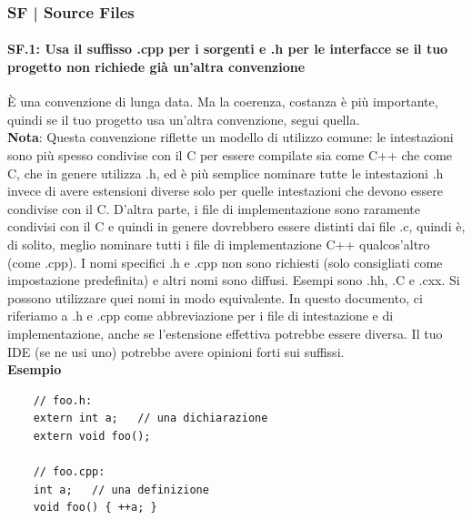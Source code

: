 

\newpage

\subsubsection{SF | Source Files}

\paragraph{SF.1: Usa il suffisso .cpp per i sorgenti e .h per le interfacce se il tuo progetto non richiede già un'altra convenzione}

\textsf{\small È una convenzione di lunga data. Ma la coerenza, costanza è più importante, quindi se il tuo progetto usa un'altra convenzione, segui quella. } \\

\textsf{\small \textbf{Nota}: Questa convenzione riflette un modello di utilizzo comune: le intestazioni sono più spesso condivise con il C per essere compilate sia come C++ che come C, che in genere utilizza .h, ed è più semplice nominare tutte le intestazioni .h invece di avere estensioni diverse solo per quelle intestazioni che devono essere condivise con il C. D'altra parte, i file di implementazione sono raramente condivisi con il C e quindi in genere dovrebbero essere distinti dai file .c, quindi è, di solito, meglio nominare tutti i file di implementazione C++ qualcos'altro (come .cpp). I nomi specifici .h e .cpp non sono richiesti (solo consigliati come impostazione predefinita) e altri nomi sono diffusi. Esempi sono .hh, .C e .cxx. Si possono utilizzare quei nomi in modo equivalente. In questo documento, ci riferiamo a .h e .cpp come abbreviazione per i file di intestazione e di implementazione, anche se l'estensione effettiva potrebbe essere diversa. Il tuo IDE (se ne usi uno) potrebbe avere opinioni forti sui suffissi.} \\

\textsf{\small \textbf{Esempio}}

\begin{lstlisting}
	// foo.h:
	extern int a;   // una dichiarazione
	extern void foo();
	
	// foo.cpp:
	int a;   // una definizione
	void foo() { ++a; }
\end{lstlisting}

